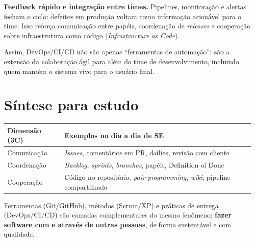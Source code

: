 \documentclass[
    12pt,
    oneside,
    a4paper,
    article,
    section=TITLE,
    sumario=abnt-6027-2012
]{abntex2}
\begin{document}
\textbf{Feedback rápido e integração entre times.} Pipelines, monitoração e alertas fecham o ciclo: defeitos em produção voltam como informação acionável para o time. Isso reforça comunicação entre papéis, coordenação de \textit{releases} e cooperação sobre infraestrutura como código (\textit{Infrastructure as Code}).

Assim, DevOps/CI/CD não são apenas ``ferramentas de automação'': são a extensão da colaboração ágil para além do time de desenvolvimento, incluindo quem mantém o sistema vivo para o usuário final.

\section{Síntese para estudo}
\label{sec:sintese}

\noindent\begin{minipage}{\textwidth}
\centering
{}
\label{tab:sintese}
\begin{tabularx}{\textwidth}{@{}lX@{}}
\toprule
\textbf{Dimensão (3C)} & \textbf{Exemplos no dia a dia de SE} \\
\midrule
Comunicação  & \textit{Issues}, comentários em PR, dailies, revisão com cliente \\
Coordenação  & \textit{Backlog}, \textit{sprints}, \textit{branches}, papéis, Definition of Done \\
Cooperação   & Código no repositório, \textit{pair programming}, \textit{wiki}, pipeline compartilhado \\
\bottomrule
\end{tabularx}
\end{minipage}

Ferramentas (Git/GitHub), métodos (Scrum/XP) e práticas de entrega (DevOps/CI/CD) são camadas complementares do mesmo fenômeno: \textbf{fazer software com e através de outras pessoas}, de forma sustentável e com qualidade.

\postextual

\end{document}
